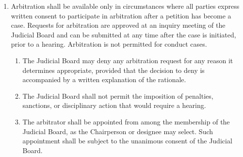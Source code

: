 \begin{enumerate}
\begin{enumerate}
      \item Dismissal: After a judicious Appeals of case materials and ensuring jurisprudential propriety, the Board may dismiss a case when warranted by evidence or procedural considerations. In such instances, the Board must provide a written rationale detailing the grounds for dismissal. Dismissal shall not be exercised in a manner that obstructs justice, restricts the rights of complainants, or silences their grievances.
        \begin{enumerate}
          \item Dismissals are appealable to the Appeals Board, which may direct the Judicial Board to hear the case, hear the case themselves, or exercise their appellate authority in any fashion deemed appropriate.
        \end{enumerate}
      \item Verdict: In concluding a hearing, a verdict is issued. Verdicts are binding, and the conclusions on the relevant matters are enforceable by sanctions.
        \begin{enumerate}
          \item After issuing a verdict, the Judicial Board shall write an assenting and a dissenting opinion, if they are not in unanimous agreement, explaining their decision on the case. Such opinions shall be considered public record and shall be delivered directly to all Union bodies and campus publications.
        \end{enumerate}
    \end{enumerate}
  \item Arbitration shall be available only in circumstances where all parties express written consent to participate in arbitration after a petition has become a case. Requests for arbitration are approved at an inquiry meeting of the Judicial Board and can be submitted at any time after the case is initiated, prior to a hearing. Arbitration is not permitted for conduct cases.
    \begin{enumerate}
      \item The Judicial Board may deny any arbitration request for any reason it determines appropriate, provided that the decision to deny is accompanied by a written explanation of the rationale.
      \item The Judicial Board shall not permit the imposition of penalties, sanctions, or disciplinary action that would require a hearing.
      \item The arbitrator shall be appointed from among the membership of the Judicial Board, as the Chairperson or designee may select. Such appointment shall be subject to the unanimous consent of the Judicial Board.

\end{enumerate}
\end{enumerate}
